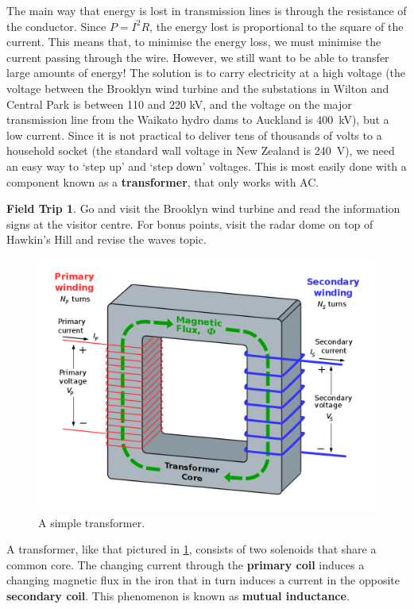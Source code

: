 \documentclass[a4paper]{amsbook}
\theoremstyle{definition}
\numberwithin{exercise}{chapter}
\numberwithin{exercise}{chapter}
\newtheorem{trip}[exercise]{Field Trip}
\begin{document}
The main way that energy is lost in transmission lines is through the resistance of the conductor. Since $ P = I^2 R $, the energy lost is
proportional to the square of the current. This means that, to minimise the energy loss, we must minimise the current passing through the
wire. However, we still want to be able to transfer large amounts of energy! The solution is to carry electricity at a high voltage (the
voltage between the Brooklyn wind turbine and the substations in Wilton and Central Park is between 110 and 220 \si{\kilo\volt}, and the
voltage on the major transmission line from the Waikato hydro dams to Auckland is \SI{400}{\kilo\volt}), but a low current. Since it is
not practical to deliver tens of thousands of volts to a household socket (the standard wall voltage in New Zealand is \SI{240}{\volt}),
we need an easy way to `step up' and `step down' voltages. This is most easily done with a component known as a \textbf{transformer}, that
only works with AC.

\begin{trip}
  Go and visit the Brooklyn wind turbine and read the information signs at the visitor centre. For bonus points, visit the radar dome
  on top of Hawkin's Hill and revise the waves topic.
\end{trip}

\begin{figure}
  \centering
  \includegraphics[width=\textwidth]{transformer}
  \caption{A simple transformer.}\label{fig:transformer}
\end{figure}

A transformer, like that pictured in \cref{fig:transformer}, consists of two solenoids that share a common core. The changing current
through the \textbf{primary coil} induces a changing magnetic flux in the iron that in turn induces a current in the opposite \textbf{secondary coil}.
This phenomenon is known as \textbf{mutual inductance}.
\end{document}
